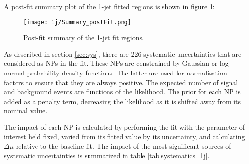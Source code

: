 A post-fit summary plot of the 1-jet fitted regions is shown in figure \ref{fig:fit_results_1j}: 

\begin{figure}[H]
    \center
    \texttt{[image: 1j/Summary\_postFit.png]}
    \caption{Post-fit summary of the 1-jet fit regions.}
    \label{fig:fit_results_1j}
\end{figure}

As described in section \ref{sec:sys}, there are 226 systematic uncertainties that are considered as NPs in the fit. These NPs are constrained by Gaussian or log-normal probability density functions. The latter are used for normalisation factors to ensure that they are always positive. The expected number of signal and background events are functions of the likelihood. The prior for each NP is added as a penalty term, decreasing the likelihood as it is shifted away from its nominal value. 

The impact of each NP is calculated by performing the fit with the parameter of interest held fixed, varied from its fitted value by its uncertainty, and calculating $\Delta\mu$ relative to the baseline fit.  The impact of the most significant sources of systematic uncertainties is summarized in table \ref{tab:systematics_1j}. 

